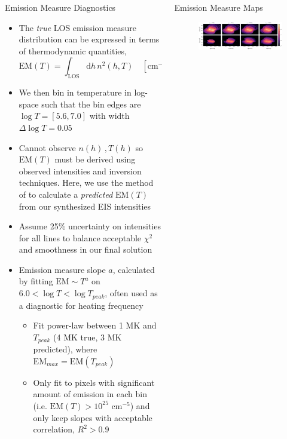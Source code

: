 \documentclass[final]{beamer}
\begin{document}
\begin{frame}
\begin{columns}[T]
\begin{column}{0.49\linewidth}
\begin{block}{Emission Measure Diagnostics}
\begin{itemize}
        \item The \alert{\textit{true}} LOS emission measure distribution can be expressed in terms of thermodynamic quantities,
              \begin{equation*}
                \mathrm{EM}(T) = \int_{\mathrm{LOS}}\mathrm{d}h\,n^2(h,T)\quad[\mathrm{cm}^{-5}]
              \end{equation*} 
        \item We then bin in temperature in log-space such that the bin edges are $\log{T}=[5.6,7.0]$ with width $\Delta\log{T}=0.05$
        \item Cannot observe $n(h)\,,T(h)$ so $\mathrm{EM}(T)$ must be derived using observed intensities and inversion techniques. Here, we use the method of \citet{hannah_differential_2012} to calculate a \alert{\textit{predicted}} $\mathrm{EM}(T)$ from our synthesized EIS intensities
        \item Assume 25\% uncertainty on intensities for all lines to balance acceptable $\chi^2$ and smoothness in our final solution
        \item Emission measure slope $a$, calculated by fitting $\mathrm{EM}\sim T^a$ on $6.0<\log{T}<\log{T_{peak}}$, often used as a diagnostic for heating frequency
        \begin{itemize}
          \item Fit power-law between 1 MK and $T_{peak}$ (4 MK true, 3 MK predicted), where $\mathrm{EM}_{max}=\mathrm{EM}(T_{peak})$
          \item Only fit to pixels with significant amount of emission in each bin (i.e. $\mathrm{EM}(T)>10^{25}\,\,\mathrm{cm}^{-5}$) and only keep slopes with acceptable correlation, $R^2>0.9$
        \end{itemize}
      \end{itemize}
    \end{block}
  \end{column}
  \begin{column}{0.49\linewidth}
    \begin{block}{Emission Measure Maps}
      \begin{figure}
        \includegraphics[width=\columnwidth]{figures/total_em_maps.pdf}

\end{figure}
\end{block}
\end{column}
\end{columns}
\end{frame}
\end{document}

